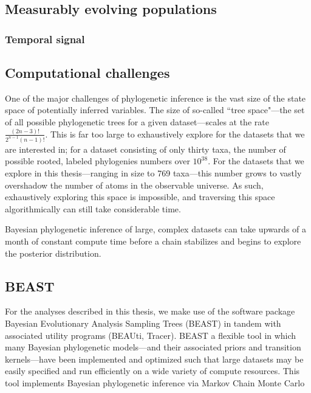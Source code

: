 
\subsection{Measurably evolving populations}

\subsubsection{Temporal signal}

%

\subsection{Computational challenges} %

One of the major challenges of phylogenetic inference is the vast size of the state space of potentially inferred variables.
The size of so-called ``tree space"---the set of all possible phylogenetic trees for a given dataset---scales at the rate $\frac{(2n-3)!}{2^{n-1}(n-1)!}$.
This is far too large to exhaustively explore for the datasets that we are interested in; for a dataset consisting of only thirty taxa, the number of possible rooted, labeled phylogenies numbers over $10^{38}$\cite{felsenstein2003inferring}.
For the datasets that we explore in this thesis---ranging in size to 769 taxa---this number grows to vastly overshadow the number of atoms in the observable universe.
As such, exhaustively exploring this space is impossible, and traversing this space algorithmically can still take considerable time.

Bayesian phylogenetic inference of large, complex datasets can take upwards of a month of constant compute time before a chain stabilizes and begins to explore the posterior distribution.

\subsection{BEAST}

For the analyses described in this thesis, we make use of the software package Bayesian Evolutionary Analysis Sampling Trees \cite{beast} (BEAST) in tandem with associated utility programs (BEAUti, Tracer).
BEAST a flexible tool in which many Bayesian phylogenetic models---and their associated priors and transition kernels---have been implemented and optimized such that large datasets may be easily specified and run efficiently on a wide variety of compute resources.
This tool implements Bayesian phylogenetic inference via Markov Chain Monte Carlo


\cleardoublepage

